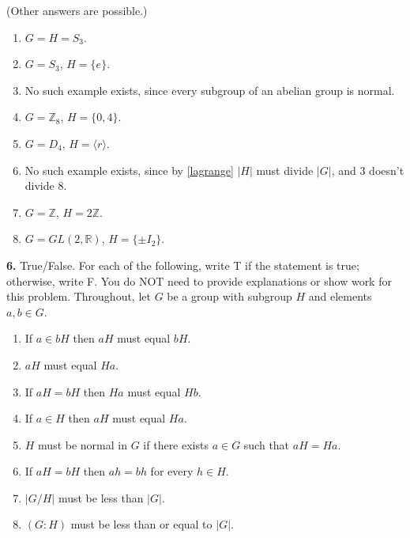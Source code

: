 \documentclass[10pt,]{book}
\theoremstyle{plain}
\theoremstyle{definition}
\theoremstyle{definition}
\theoremstyle{definition}
\theoremstyle{definition}
\numberwithin{equation}{section}
\def\Z{\mathbb{Z}}
\def\R{\mathbb{R}}
\begin{document}
\par\smallskip

      (Other answers are possible.)
      \leavevmode%
\begin{enumerate}[label=(\alph*)]
\item\hypertarget{li-453}{}
            \(G=H=S_3\).
\item\hypertarget{li-454}{}
            \(G=S_3\), \(H=\{e\}\).
\item\hypertarget{li-455}{}
            No such example exists, since every subgroup of an abelian group is normal.
\item\hypertarget{li-456}{}
            \(G=\Z_8\), \(H=\{0,4\}\).
\item\hypertarget{li-457}{}
            \(G=D_4\), \(H=\langle r\rangle\).
\item\hypertarget{li-458}{}
            No such example exists, since by \hyperref[lagrange]{\ref{lagrange}} \(|H|\) must divide \(|G|\), and 3 doesn't divide 8.
\item\hypertarget{li-459}{}
            \(G=\Z\), \(H=2\Z\).
\item\hypertarget{li-460}{}
            \(G=GL(2,\R)\), \(H=\{\pm I_2\}\).
\end{enumerate}

\par\smallskip
\noindent\textbf{6.}\quad{}
        True/False. For each of the following, write T if the statement is
        true; otherwise, write F. You do NOT need to provide explanations or show work for this problem. Throughout, let \(G\) be a group with subgroup \(H\) and elements \(a,b\in G\).
        \leavevmode%
\begin{enumerate}[label=(\alph*)]
\item\hypertarget{li-461}{}
              If \(a\in bH\) then \(aH\) must equal \(bH\).
\item\hypertarget{li-462}{}
              \(aH\) must equal \(Ha\).
\item\hypertarget{li-463}{}
              If \(aH=bH\) then \(Ha\) must equal \(Hb\).
\item\hypertarget{li-464}{}
              If \(a\in H\) then \(aH\) must equal \(Ha\).
\item\hypertarget{li-465}{}
              \(H\) must be normal in \(G\) if there exists \(a\in G\) such that \(aH=Ha\).
\item\hypertarget{li-466}{}
              If \(aH=bH\) then \(ah=bh\) for every \(h\in H\).
\item\hypertarget{li-467}{}
              \(|G/H|\) must be less than \(|G|\).
\item\hypertarget{li-468}{}
              \((G:H)\) must be less than or equal to \(|G|\).
\end{enumerate}
\end{document}
